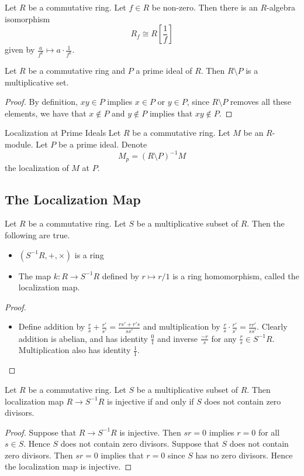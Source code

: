 \documentclass[a4paper]{article}
\begin{document}
\begin{lmm}{}{} Let $R$ be a commutative ring. Let $f\in R$ be non-zero. Then there is an $R$-algebra isomorphism $$R_f\cong R\left[\frac{1}{f}\right]$$ given by $\frac{a}{f^k}\mapsto a\cdot\frac{1}{f^k}$. 
\end{lmm}

\begin{lmm}{}{} Let $R$ be a commutative ring and $P$ a prime ideal of $R$. Then $R\setminus P$ is a multiplicative set. \tcbline
\begin{proof}
By definition, $xy\in P$ implies $x\in P$ or $y\in P$, since $R\setminus P$ removes all these elements, we have that $x\notin P$ and $y\notin P$ implies that $xy\notin P$. 
\end{proof}
\end{lmm}

\begin{defn}{Localization at Prime Ideals}{} Let $R$ be a commutative ring. Let $M$ be an $R$-module. Let $P$ be a prime ideal. Denote $$M_p=(R\setminus P)^{-1}M$$ the localization of $M$ at $P$. 
\end{defn}
\subsection{The Localization Map}
\begin{prp}{}{} Let $R$ be a commutative ring. Let $S$ be a multiplicative subset of $R$. Then the following are true. 
\begin{itemize}
\item $(S^{-1}R,+,\times)$ is a ring
\item The map $k:R\to S^{-1}R$ defined by $r\mapsto r/1$ is a ring homomorphism, called the localization map. 
\end{itemize}\tcbline
\begin{proof}~\\
\begin{itemize}
\item Define addition by $\frac{r}{s}+\frac{r'}{s'}=\frac{rs'+r's}{ss'}$ and multiplication by $\frac{r}{s}\cdot\frac{r'}{s'}=\frac{rr'}{ss'}$. Clearly addition is abelian, and has identity $\frac{0}{1}$ and inverse $\frac{-r}{s}$ for any $\frac{r}{s}\in S^{-1}R$. Multiplication also has identity $\frac{1}{1}$. 
\end{itemize}
\end{proof}
\end{prp}

\begin{lmm}{}{} Let $R$ be a commutative ring. Let $S$ be a multiplicative subset of $R$. Then localization map $R\to S^{-1}R$ is injective if and only if $S$ does not contain zero divisors. \tcbline
\begin{proof}
Suppose that $R\to S^{-1}R$ is injective. Then $sr=0$ implies $r=0$ for all $s\in S$. Hence $S$ does not contain zero divisors. Suppose that $S$ does not contain zero divisors. Then $sr=0$ implies that $r=0$ since $S$ has no zero divisors. Hence the localization map is injective. 
\end{proof}
\end{lmm}
\end{document}
